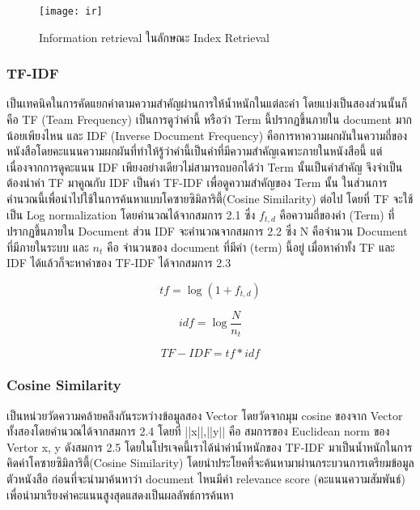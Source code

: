     \begin{figure}[H]
        \centering
        \texttt{[image: ir]}
        \caption{Information retrieval ในลักษณะ Index Retrieval}\label{fig:ir}
    \end{figure}

\subsubsection{TF-IDF}

เป็นเทคนิคในการคัดแยกคำตามความสำคัญผ่านการให้น้ำหนักในแต่ละคำ โดยแบ่งเป็นสองส่วนนั้นก็คือ TF (Team Frequency) เป็นการดูว่าคำนี้ หรือว่า Term นี้ปรากฏขึ้นภายใน document มากน้อยเพียงไหน และ IDF (Inverse  Document Frequency) คือการหาความผกผันในความถี่ของหนังสือโดยคะแนนความผกผันที่ทำให้รู้ว่าคำนี้เป็นคำที่มีความสำคัญเฉพาะภายในหนังสือนี้ แต่เนื่องจากการดูคะแนน IDF เพียงอย่างเดียวไม่สามารถบอกได้ว่า Term นั้นเป็นคำสำคัญ จึงจำเป็นต้องนำค่า TF มาคูณกับ IDF เป็นค่า TF-IDF เพื่อดูความสำคัญของ Term นั้น ในส่วนการคำนวณนี้เพื่อนำไปใช้ในการค้นหาแบบโคซายซิมิลาริตี้(Cosine Similarity) ต่อไป โดยที่ TF จะใช้เป็น Log normalization โดยคำนวณได้จากสมการ 2.1 ซึ่ง $f_{t,d}$ คือความถี่ของคำ (Term) ที่ปรากฏขึ้นภายใน Document ส่วน IDF จะคำนวณจากสมการ 2.2 ซึ่ง N คือจำนวน Document ที่มีภายในระบบ และ $n_{t}$ คือ จำนวนของ document ที่มีคำ (term) นี้อยู่ เมื่อหาค่าทั้ง TF และ IDF ได้แล้วก็จะหาค่าของ TF-IDF ได้จากสมการ 2.3

\begin{equation}
    tf=\log{(1+f_{t,d})}
    \end{equation}

\begin{equation}
    idf=\log{\frac{N}{n_{t}}}
\end{equation}

\begin{equation}
    TF-IDF=tf*idf
    \end{equation}    

\subsubsection{Cosine Similarity}

เป็นหน่วยวัดความคล้ายคลึงกันระหว่างข้อมูลสอง Vector โดยวัดจากมุม cosine ของจาก Vector ทั้งสองโดยคำนวณได้จากสมการ 2.4 โดยที่ ||x||,||y|| คือ สมการของ Euclidean norm ของ Vertor x, y ดังสมการ 2.5 โดยในโปรเจคนี้เราได้นำค่าน้ำหนักของ TF-IDF มาเป็นน้ำหนักในการคิดค่าโคซายซิมิลาริตี้(Cosine Similarity) โดยนำประโยคที่จะค้นหามาผ่านกระบวนการเตรียมข้อมูลตัวหนังสือ ก่อนที่จะนำมาค้นหาว่า document ไหนมีค่า relevance score (คะแนนความสัมพันธ์) เพื่อนำมาเรียงค่าคะแนนสูงสุดแสดงเป็นผลลัพธ์การค้นหา


